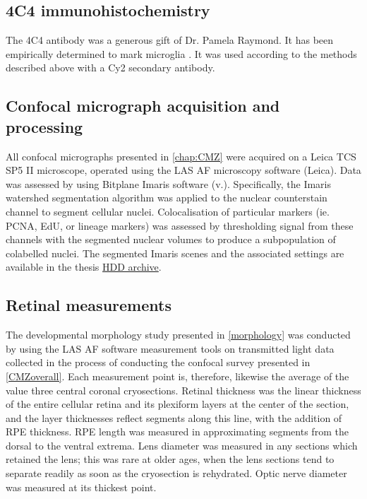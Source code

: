 \subsection{4C4 immunohistochemistry}
The 4C4 antibody was a generous gift of Dr. Pamela Raymond. It has been empirically determined to mark microglia \cite{Becker2001}. It was used according to the methods described above with a Cy2 secondary antibody.

\subsection{Confocal micrograph acquisition and processing}
All confocal micrographs presented in \autoref{chap:CMZ} were acquired on a Leica TCS SP5 II microscope, operated using the LAS AF microscopy software (Leica). Data was assessed by using Bitplane Imaris software (v.). Specifically, the Imaris watershed segmentation algorithm was applied to the nuclear counterstain channel to segment cellular nuclei. Colocalisation of particular markers (ie. PCNA, EdU, or lineage markers) was assessed by thresholding signal from these channels with the segmented nuclear volumes to produce a subpopulation of colabelled nuclei. The segmented Imaris scenes and the associated settings are available in the thesis \hyperref[archive]{HDD archive}.

\subsection{Retinal measurements}
The developmental morphology study presented in \autoref{morphology} was conducted by using the LAS AF software measurement tools on transmitted light data collected in the process of conducting the confocal survey presented in \autoref{CMZoverall}. Each measurement point is, therefore, likewise the average of the value three central coronal cryosections. Retinal thickness was the linear thickness of the entire cellular retina and its plexiform layers at the center of the section, and the layer thicknesses reflect segments along this line, with the addition of RPE thickness. RPE length was measured in approximating segments from the dorsal to the ventral extrema. Lens diameter was measured in any sections which retained the lens; this was rare at older ages, when the lens sections tend to separate readily as soon as the cryosection is rehydrated. Optic nerve diameter was measured at its thickest point.

